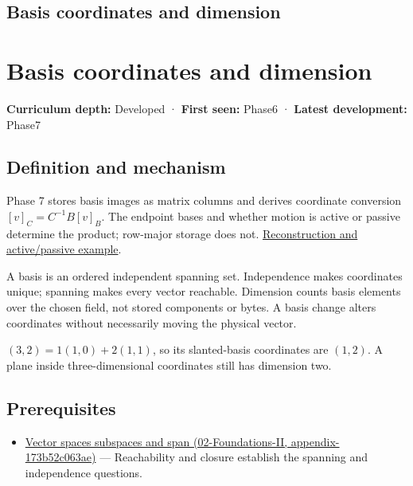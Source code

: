 \hypertarget{appendix-ce0341f7ea0d}{}
\section*{Basis coordinates and dimension}
\chapter{Basis coordinates and dimension}\label{appendix-ce0341f7ea0d-basis-coordinates-and-dimension}

\textbf{Curriculum depth:} Developed · \textbf{First seen:} Phase6 · \textbf{Latest development:} Phase7

\section{Definition and mechanism}\label{appendix-ce0341f7ea0d-definition-and-mechanism}

Phase 7 stores basis images as matrix columns and derives coordinate conversion \([v]_C=C^{-1}B[v]_B\). The endpoint bases and whether motion is active or passive determine the product; row-major storage does not. \href{Continuous\%20Notes/Computing\%20Foundations\%20-\%20From\%20Bits\%20to\%20C++\%20and\%20Systems\%20APIs\#Coordinates\%20can\%20change\%20while\%20the\%20geometric\%20object\%20stays\%20still}{Reconstruction and active/passive example}.

A basis is an ordered independent spanning set. Independence makes coordinates unique; spanning makes every vector reachable. Dimension counts basis elements over the chosen field, not stored components or bytes. A basis change alters coordinates without necessarily moving the physical vector.

\((3,2)=1(1,0)+2(1,1)\), so its slanted-basis coordinates are \((1,2)\). A plane inside three-dimensional coordinates still has dimension two.

\section{Prerequisites}\label{appendix-ce0341f7ea0d-prerequisites}

\begin{itemize}
\tightlist
\item
  \href{../02-Foundations-II/main.pdf\#nameddest=appendix-173b52c063ae}{Vector spaces subspaces and span (02-Foundations-II, appendix-173b52c063ae)} --- Reachability and closure establish the spanning and independence questions.
\end{itemize}

